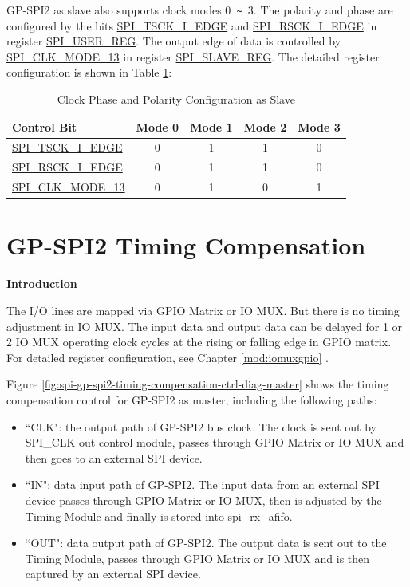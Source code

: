\documentclass[main\_\_EN.tex]{subfiles}
\begin{document}
GP-SPI2 as slave also supports clock modes 0\verb+ ~ +3. The polarity and phase are configured by the bits \hyperref[fielddesc:SPITSCKIEDGE]{SPI\_TSCK\_I\_EDGE} and \hyperref[fielddesc:SPIRSCKIEDGE]{SPI\_RSCK\_I\_EDGE} in register \hyperref[regdesc:SPIUSERREG]{SPI\_USER\_REG}. The output edge of data is controlled by \hyperref[fielddesc:SPICLKMODE13]{SPI\_CLK\_MODE\_13} in register \hyperref[regdesc:SPISLAVEREG]{SPI\_SLAVE\_REG}. The detailed register configuration is shown in Table \ref{table:clock_pol_slave}: 

\begin{table}[H]
    \centering
    \caption{Clock Phase and Polarity Configuration as Slave}
    \label{table:clock_pol_slave}
    \begin{tabular}[c]{|p{3.5cm}|c|c|c|c|}
    \hline
    \rowcolor{lightgray}
    \textbf{Control Bit} & \textbf{Mode 0} & \textbf{Mode 1} & \textbf{Mode 2} & \textbf{Mode 3}\\
    \hline
    \hyperref[fielddesc:SPITSCKIEDGE]{SPI\_TSCK\_I\_EDGE}   & 0 & 1 & 1 & 0\\
    \hline
    \hyperref[fielddesc:SPIRSCKIEDGE]{SPI\_RSCK\_I\_EDGE}   & 0 & 1 & 1 & 0\\
    \hline
    \hyperref[fielddesc:SPICLKMODE13]{SPI\_CLK\_MODE\_13}     & 0 & 1 & 0 & 1\\
    \hline    
    \end{tabular}
\end{table}


\section{GP-SPI2 Timing Compensation} \label{sec:gp-spi-timing-compensation}

\textbf{Introduction}

The I/O lines are mapped via GPIO Matrix or IO MUX. But there is no timing adjustment in IO MUX. The input data and output data can be delayed for 1 or 2 IO MUX operating clock cycles at the rising or falling edge in GPIO matrix. For detailed register configuration, see Chapter \ref{mod:iomuxgpio} \textit{}.

Figure \ref{fig:spi-gp-spi2-timing-compensation-ctrl-diag-master} shows the timing compensation control for GP-SPI2 as master, including the following paths:
\begin{itemize}
    \item ``CLK": the output path of GP-SPI2 bus clock. The clock is sent out by SPI\_CLK out control module, passes through GPIO Matrix or IO MUX and then goes to an external SPI device.

    \item ``IN": data input path of GP-SPI2. The input data from an external SPI device passes through GPIO Matrix or IO MUX, then is adjusted by the Timing Module and finally is stored into spi\_rx\_afifo.
    
    \item ``OUT": data output path of GP-SPI2. The output data is sent out to the Timing Module, passes through GPIO Matrix or IO MUX and is then captured by an external SPI device.
\end{itemize}
\end{document}
